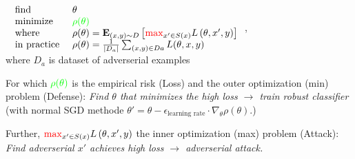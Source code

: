 \documentclass[11pt]{extarticle}
\begin{document}
\begin{multicols*}{3}
			$\left. \begin{array} { l l } { \text { find } } & { \theta } \\ 
			{ \text { minimize } } & {{\color{green} \rho ( \theta ) }} \\ 
			{\text { where } } & { \rho ( \theta ) = \mathbf { E } _ { ( x , y ) \sim D } \left[ \mathbin{\textcolor{red} \max _ { x ^ { \prime } \in S ( x ) } L \left( \theta , x ^ { \prime } , y \right)} \right]} \\
			{ \text { in practice } } & { \rho ( \theta ) = \frac { 1 } { \left| D _ { a } \right| } \sum _ { ( x , y ) \in D a } L ( \theta , x , y ) } \end{array} \right.$, \\
			where  $D _ { a }$ is dataset of adverserial examples
			
			For which ${{\color{green} \rho ( \theta ) }}$ is the empirical risk (Loss) and the {\color{green} outer } optimization ({\color{green}min}) problem (Defense): \textit{Find $\theta$ that minimizes the high loss $\rightarrow$ train robust classifier} (with normal SGD methode $\theta' = \theta - \epsilon_{\text{learning rate}} \cdot \nabla _ { \theta } \rho ( \theta )$.)
			
			Further, $\mathbin{\textcolor{red} \max _ { x ^ { \prime } \in S ( x ) } L \left( \theta , x ^ { \prime } , y \right)}$ the {\color{red} inner} optimization ({\color{red}max}) problem (Attack): \textit{Find adverserial $x\prime$ achieves high loss  $\rightarrow$ adverserial attack.}
		

\end{multicols*}
\end{document}

